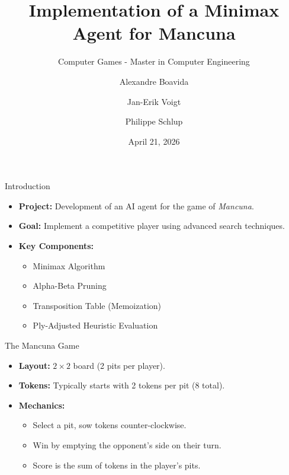 \documentclass{beamer}
\title[Minimax Mancuna Agent]{Implementation of a Minimax Agent for Mancuna}
\subtitle{Computer Games - Master in Computer Engineering}
\author[Boavida, Voigt, Schlup]{Alexandre Boavida \and Jan-Erik Voigt \and Philippe Schlup}
\institute[UAlg]{University of Algarve \\ Faculty of Science and Technology}
\date{April 21, 2026}
\begin{document}
\begin{frame}
    \titlepage
\end{frame}

\begin{frame}{Introduction}
    \begin{itemize}
        \item \textbf{Project:} Development of an AI agent for the game of \textit{Mancuna}.
        \item \textbf{Goal:} Implement a competitive player using advanced search techniques.
        \item \textbf{Key Components:}
        \begin{itemize}
            \item Minimax Algorithm
            \item Alpha-Beta Pruning
            \item Transposition Table (Memoization)
            \item Ply-Adjusted Heuristic Evaluation
        \end{itemize}
    \end{itemize}
\end{frame}

\begin{frame}{The Mancuna Game}
    \begin{itemize}
        \item \textbf{Layout:} $2 \times 2$ board (2 pits per player).
        \item \textbf{Tokens:} Typically starts with 2 tokens per pit (8 total).
        \item \textbf{Mechanics:}
        \begin{itemize}
            \item Select a pit, sow tokens counter-clockwise.
            \item Win by emptying the opponent's side on their turn.
            \item Score is the sum of tokens in the player's pits.
        \end{itemize}
    \end{itemize}
\end{frame}
\end{document}
